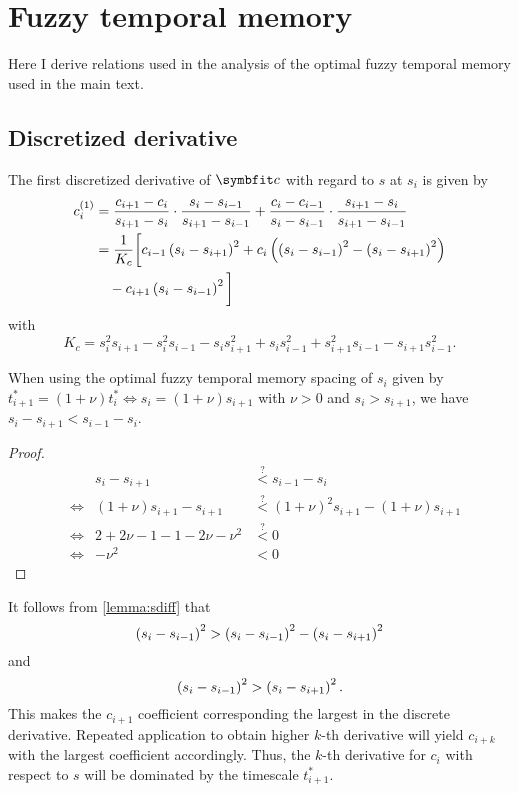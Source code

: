 \chapter{Fuzzy temporal memory}
Here I derive relations used in the analysis of the optimal fuzzy temporal memory \parencite{shankar2013} used in the main  text.

\section{Discretized derivative}\label{apdx:fuzzymem-derivative}
The first discretized derivative of $\vc c$ with regard to $s$ at $s_i$ is given by \parencite{shankar2013}
\begin{equation}\begin{split}
    c_i^{(1)} &= \frac{c_{i+1} - c_i}{s_{i+1} - s_i} \cdot \frac{s_i - s_{i-1}}{s_{i+1} - s_{i-1}} + \frac{c_i - c_{i-1}}{s_i - s_{i-1}} \cdot \frac{s_{i+1} - s_i}{s_{i+1} - s_{i-1}} \\
    &= \frac{1}{K_c} \bigg[c_{i-1} \del{s_i - s_{i+1}}^2 + c_i \del{\del{s_i - s_{i-1}}^2 - \del{s_i - s_{i+1}}^2}\\&\quad - c_{i+1} \del{s_i - s_{i-1}}^2 \bigg]
\end{split}\end{equation}
with
\begin{equation*}
    K_c = s_i^2 s_{i+1} - s_i^2 s_{i-1} - s_i s_{i+1}^2 + s_i s_{i-1}^2 + s_{i+1}^2 s_{i-1} - s_{i+1} s_{i-1}^2 \text{.}
\end{equation*}
\begin{lemma}\label{lemma:sdiff}
    When using the optimal fuzzy temporal memory spacing of $s_i$ given by $t^*_{i+1} = (1 + \nu) t^*_i \Leftrightarrow s_i = (1 + \nu) s_{i+1}$ with $\nu > 0$ and $s_i > s_{i+1}$, we have $s_i - s_{i+1} < s_{i-1} - s_i$.
    \begin{proof}
        \begin{align*}
            && s_i - s_{i+1} &\stackrel{?}{<} s_{i-1} - s_i \\
            &\Leftrightarrow& (1+\nu) s_{i+1} - s_{i+1} &\stackrel{?}{<} {(1+\nu)}^2 s_{i+1} - (1+\nu) s_{i+1} \\
            &\Leftrightarrow& 2 + 2\nu - 1 - 1 - 2\nu - \nu^2 &\stackrel{?}{<} 0 \\
            &\Leftrightarrow& -\nu^2 &< 0
        \end{align*}
    \end{proof}
\end{lemma}
\noindent It follows from \cref{lemma:sdiff} that
\begin{equation}
    \del{s_i - s_{i-1}}^2 > \del{s_i - s_{i-1}}^2 - \del{s_i - s_{i+1}}^2
\end{equation}
and
\begin{equation}
    \del{s_i - s_{i-1}}^2 > \del{s_i - s_{i+1}}^2 \text{.}
\end{equation}
This makes the $c_{i+1}$ coefficient corresponding the largest in the discrete derivative.
Repeated application to obtain higher $k$-th derivative will yield $c_{i+k}$ with the largest coefficient accordingly.
Thus, the $k$-th derivative for $c_i$ with respect to $s$ will be dominated by the timescale $t^*_{i+1}$.


